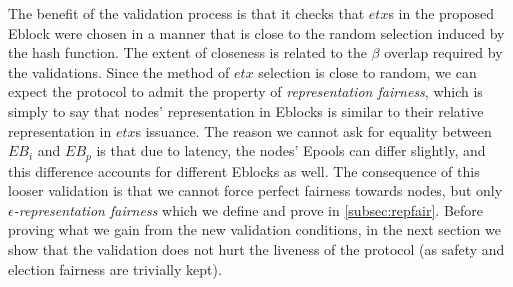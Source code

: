




The benefit of the validation process is that it checks that $etx$s in the proposed Eblock were chosen in a manner that is close to the random selection induced by the hash function. The extent of closeness is related to the $\beta$ overlap required by the validations. Since the method of $etx$ selection is close to random, we can expect the protocol to admit the property of \textit{representation fairness}, which is simply to say that nodes' representation in Eblocks is similar to their relative representation in $etx$s issuance. The reason we cannot ask for equality between $EB_i$ and $EB_p$ is that due to latency, the nodes' Epools can differ slightly, and this difference accounts for different Eblocks as well. The consequence of this looser validation is that we cannot force perfect fairness towards nodes, but only $\epsilon$\textit{-representation fairness} which we define and prove in \ref{subsec:repfair}.
Before proving what we gain from the new validation conditions, in the next section we show that the validation does not hurt the liveness of the protocol (as safety and election fairness are trivially kept).


